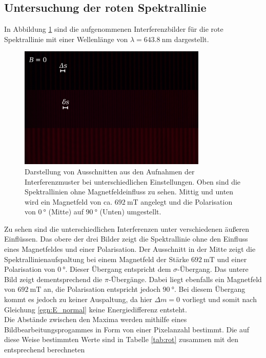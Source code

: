  \subsection{Untersuchung der roten Spektrallinie}
 In Abbildung \ref{fig:rot} sind die aufgenommenen Interferenzbilder für die rote Spektrallinie
 mit einer Wellenlänge von $\lambda = \SI{643.8}{\nano\meter}$ dargestellt.
 \begin{figure}[H]
     \centering
     \includegraphics[width=0.8\textwidth]{images/zebraplot_rot.jpg}
     \caption{Darstellung von Ausschnitten aus den Aufnahmen der Interferenzmuster bei unterschiedlichen
     Einstellungen. Oben sind die Spektrallinien ohne Magnetfeldeinfluss zu sehen. Mittig und unten
     wird ein Magnetfeld von ca. $\SI{692}{\milli\tesla}$ angelegt und die Polarisation von $\SI{0}{\degree}$ (Mitte)
     auf $\SI{90}{\degree}$ (Unten) umgestellt.}
     \label{fig:rot}
 \end{figure} \noindent
 Zu sehen sind die unterschiedlichen Interferenzen unter verschiedenen äußeren Einflüssen. Das obere der drei
 Bilder zeigt die Spektrallinie ohne den Einfluss eines Magnetfeldes und einer Polarisation. Der Ausschnitt in
 der Mitte zeigt die Spektrallinienaufspaltung bei einem Magnetfeld der Stärke $\SI{692}{\milli\tesla}$ und
 einer Polarisation von $\SI{0}{\degree}$. Dieser Übergang entspricht dem $\sigma$-Übergang. Das untere
 Bild zeigt dementsprechend die $\pi$-Übergänge. Dabei liegt ebenfalls ein Magnetfeld von $\SI{692}{\milli\tesla}$
 an, die Polarisation entspricht jedoch $\SI{90}{\degree}$. Bei diesem Übergang kommt es jedoch zu keiner
 Auspaltung, da hier $\Delta m = 0$ vorliegt und somit nach Gleichung \eqref{egn:E_normal} keine Energiedifferenz
 entsteht. \\
 Die Abstände zwischen den Maxima werden mithilfe eines Bildbearbeitungsprogammes in Form von einer Pixelanzahl bestimmt.
 Die auf diese Weise bestimmten Werte sind in Tabelle \ref{tab:rot} zusammen mit den entsprechend berechneten
